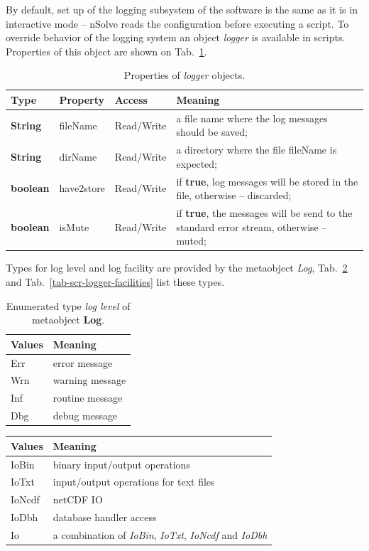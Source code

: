 \documentclass [10pt,letterpaper]{report}
\newcommand{\nuSolve}{\greektext n\latintext Solve}
\begin{document}
{{By default, set up of the logging subsystem of the software is the same as it is in
interactive mode -- \nuSolve{} reads the configuration before executing a script. To
override behavior of the logging system an object {\sl logger} is available in scripts.
Properties of this object are shown on Tab.~\ref{tab-scr-logger}.

\begin{table}[htb]
\centering
\footnotesize
\begin{tabular}{lllp{}}
\hline
Type & Property & Access & Meaning\\
\hline
  {\bf String}  & fileName      & Read/Write& a file name where the log messages should be saved;\\
  {\bf String}  & dirName       & Read/Write& a directory where the file {fileName} is expected;\\
  {\bf boolean} & have2store    & Read/Write& if {\bf true}, log messages will be stored in the file,
    otherwise -- discarded;\\
  {\bf boolean} & isMute        & Read/Write& if {\bf true}, the messages will be send to the standard
    error stream, otherwise -- muted;\\
\hline
\end{tabular}
\caption{Properties of {\sl logger} objects.}
\label{tab-scr-logger}
\end{table}

\noindent
Types for log level and log facility are provided by the metaobject {\sl Log},
Tab.~\ref{tab-scr-logger-levels} and Tab.~\ref{tab-scr-logger-facilities}
list these types.


\begin{table}[htb]
\centering
\footnotesize
\begin{tabular}{ll}
\hline
Values & Meaning\\
\hline
Err & error message\\
Wrn & warning message\\
Inf & routine message\\
Dbg & debug message\\
\hline
\end{tabular}
\caption{Enumerated type {\sl log level} of metaobject {\bf Log}.}
\label{tab-scr-logger-levels}
\end{table}


\begin{table}[htb]
\centering
\footnotesize
\begin{tabular}{lp{}}
\hline
Values & Meaning\\
\hline
IoBin           & binary input/output operations\\
IoTxt           & input/output operations for text files\\
IoNcdf          & netCDF IO\\
IoDbh           & database handler access\\
Io              & a combination of {\sl IoBin}, {\sl IoTxt}, {\sl IoNcdf} and {\sl IoDbh}\\


\end{tabular}
\end{table}}}
\end{document}
